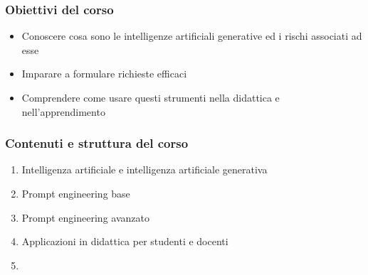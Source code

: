 

\begin{contentframe}
    \frametitle{Obiettivi del corso}

    \begin{itemize}
        \item Conoscere cosa sono le intelligenze artificiali generative ed i rischi associati ad esse
        
        \bigskip
        \item Imparare a formulare richieste efficaci

        \bigskip
        \item Comprendere come usare questi strumenti nella didattica e nell'apprendimento
    \end{itemize}
\end{contentframe}

\begin{contentframe}
    \frametitle{Contenuti e struttura del corso}

    \begin{enumerate}
        \item Intelligenza artificiale e intelligenza artificiale generativa
        \item Prompt engineering base
        \item Prompt engineering avanzato
        \item Applicazioni in didattica per studenti e docenti
        \item 
    \end{enumerate}
\end{contentframe}



